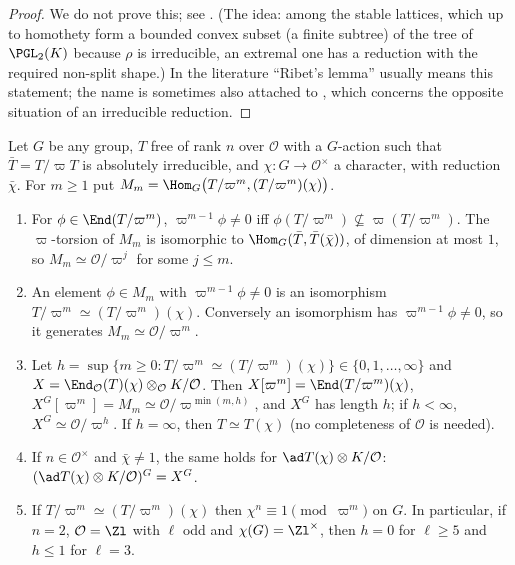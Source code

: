 \begin{proof}
We do not prove this; see \cite[Section 2]{Ribet76}. (The idea: among the stable lattices, which up to homothety form a bounded convex subset (a finite subtree) of
the tree of $\PGL_2(K)$ because $\rho$ is irreducible, an extremal one has a reduction with the required non-split shape.) In the literature
``Ribet's lemma'' usually means this statement; the name is sometimes also attached to , which concerns the opposite
situation of an irreducible reduction.
\end{proof}

\begin{proposition}\label{prop:reps:twist-length}
Let $G$ be any group, $T$ free of rank $n$ over $\mathcal{O}$ with a $G$-action such that $\bar T=T/\varpi T$ is absolutely irreducible, and $\chi\colon G\to\mathcal{O}^\times$ a
character, with reduction $\bar\chi$. For $m\ge1$ put $M_m=\Hom_G\bigl(T/\varpi^m,(T/\varpi^m)(\chi)\bigr)$.
\begin{enumerate}[label=(\roman*)]
\item For $\phi\in\End(T/\varpi^m)$, $\varpi^{m-1}\phi\ne0$ iff $\phi(T/\varpi^m)\not\subseteq\varpi(T/\varpi^m)$. The $\varpi$-torsion of $M_m$ is isomorphic to $\Hom_G(\bar T,\bar T(\bar\chi))$, of
dimension at most $1$, so $M_m\simeq\mathcal{O}/\varpi^j$ for some $j\le m$.
\item An element $\phi\in M_m$ with $\varpi^{m-1}\phi\ne0$ is an isomorphism $T/\varpi^m\simeq(T/\varpi^m)(\chi)$. Conversely an isomorphism has $\varpi^{m-1}\phi\ne0$, so it
generates $M_m\simeq\mathcal{O}/\varpi^m$.
\item Let $h=\sup\{m\ge0:T/\varpi^m\simeq(T/\varpi^m)(\chi)\}\in\{0,1,\dots,\infty\}$ and $X=\End_\mathcal{O}(T)(\chi)\otimes_\mathcal{O}K/\mathcal{O}$. Then $X[\varpi^m]=\End(T/\varpi^m)(\chi)$,
$X^G[\varpi^m]=M_m\simeq\mathcal{O}/\varpi^{\min(m,h)}$, and $X^G$ has length $h$; if $h<\infty$, $X^G\simeq\mathcal{O}/\varpi^h$. If $h=\infty$, then $T\simeq T(\chi)$ (no
completeness of $\mathcal{O}$ is needed).
\item If $n\in\mathcal{O}^\times$ and $\bar\chi\ne1$, the same holds for $\ad T(\chi)\otimes K/\mathcal{O}$: $(\ad T(\chi)\otimes K/\mathcal{O})^G=X^G$.
\item If $T/\varpi^m\simeq(T/\varpi^m)(\chi)$ then $\chi^n\equiv1\pmod{\varpi^m}$ on $G$. In particular, if $n=2$, $\mathcal{O}=\Zl$ with $\ell$ odd and $\chi(G)=\Zl^\times$, then $h=0$
for $\ell\ge5$ and $h\le1$ for $\ell=3$.
\end{enumerate}
\end{proposition}

